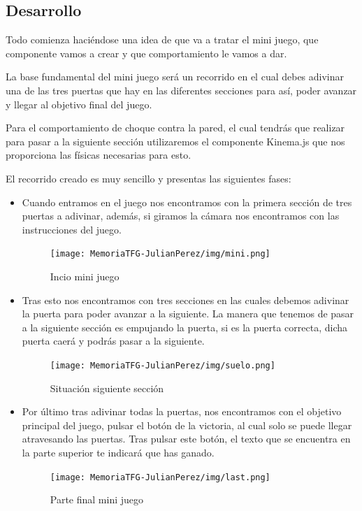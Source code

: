 \documentclass[a4paper, 12pt]{book}
\begin{document}
\subsection{Desarrollo}
Todo comienza haciéndose una idea de que va a tratar el mini juego, que componente vamos a crear y que comportamiento le vamos a dar.

La base fundamental del mini juego será un recorrido en el cual debes adivinar una de las tres puertas que hay en las diferentes secciones para así, poder avanzar y llegar al objetivo final del juego.

Para el comportamiento de choque contra la pared, el cual tendrás que realizar para pasar a la siguiente sección utilizaremos el componente Kinema.js que nos proporciona las físicas necesarias para esto. 

El recorrido creado es muy sencillo y presentas las siguientes fases:

\begin{itemize}
    \item Cuando entramos en el juego nos encontramos con la primera sección de tres puertas a adivinar, además, si giramos la cámara nos encontramos con las instrucciones del juego.
    \begin{figure}[H]
  \centering
  \texttt{[image: MemoriaTFG-JulianPerez/img/mini.png]}
  \caption{Incio mini juego}\label{scrum}
\end{figure}
    \item Tras esto nos encontramos con tres secciones en las cuales debemos adivinar la puerta para poder avanzar a la siguiente. La manera que tenemos de pasar a la siguiente sección es empujando la puerta, si es la puerta correcta, dicha puerta caerá y podrás pasar a la siguiente.
     \begin{figure}[H]
  \centering
  \texttt{[image: MemoriaTFG-JulianPerez/img/suelo.png]}
  \caption{Situación siguiente sección}\label{scrum}
\end{figure}
    \item Por último tras adivinar todas la puertas, nos encontramos con el objetivo principal del juego, pulsar el botón de la victoria, al cual solo se puede llegar atravesando las puertas. Tras pulsar este botón, el texto que se encuentra en la parte superior te indicará que has ganado.
         \begin{figure}[H]
  \centering
  \texttt{[image: MemoriaTFG-JulianPerez/img/last.png]}
  \caption{Parte final mini juego}\label{scrum}
\end{figure}

\end{itemize}
\end{document}
